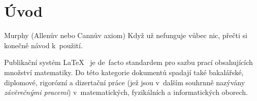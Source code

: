 

\chapter*{Úvod}\label{intro}


\begin{motto}{Murphy (Allenův nebo Cannův axiom)}
Když už nefunguje vůbec nic, přečti si konečně návod k~použití.
\end{motto}

\noindent
Publikační systém \LaTeX{}~\cite{Lam:1994:LaTeX:,%
  Goo-Mit-Sam:1994:Companion:,%
  LaTeXNet:LIVE:TheLaTeXNetwork:} je de~facto standardem pro sazbu prací
obsahujících množství matematiky. Do této kategorie dokumentů spadají také
bakalářské, diplomové, rigorózní a dizertační práce (jež jsou v~dalším
souhrnně nazývány \emph{závěrečnými pracemi}) v~matematických, fyzikálních a
informatických oborech.

